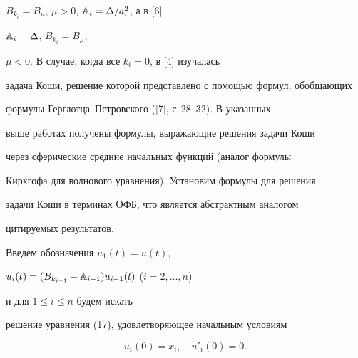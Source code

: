 $B_{k_i}=B_\mu$, $\mu>0$, $\Bbb A_i=\Delta/a^2_i$, а в [6] 


$\Bbb A_i=\Delta$, $B_{k_i}=B_\mu$, 


$\mu<0$. В случае, когда все $k_i=0$, в [4] изучалась 


задача Коши, решение которой представлено с помощью формул, обобщающих 


формулы Герглотца--Петровского ([7], с.\,28--32). В указанных 


выше работах получены формулы, выражающие решения задачи Коши 


через сферические средние начальных функций (аналог формулы  


Кирхгофа для волнового уравнения). Установим формулы для решения


задачи Коши в терминах ОФБ, что является абстрактным аналогом 


цитируемых результатов.  


 


Введем обозначения $u_1(t)=u(t)$, 


$u_i(t)=(B_{k_{i-1}}-\Bbb A_{i-1})u_{i-1}(t)$ ($i=2,\dotsc,n$) 


и для $1\le i\le n$ будем искать 


решение уравнения (17), удовлетворяющее начальным условиям 


\begin{equation} 


u_i(0)=x_i,\quad u'_i(0)=0. 


\end{equation} 


 


